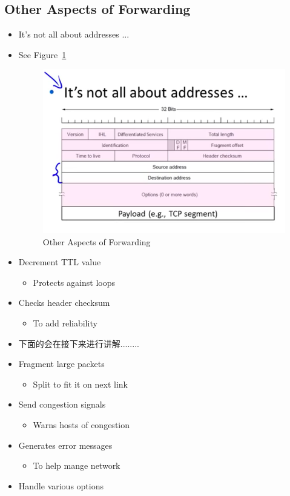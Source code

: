 \documentclass[12pt]{ctexart}   %
\begin{document}
	\subsection{Other Aspects of Forwarding}
	\begin{itemize}
		\item It's not all about addresses ...
		\item See Figure~\ref{fig:4-5-4}
		
		\begin{figure}[h!] %
		\centering
		 \includegraphics[scale=0.7]{images/4-5-4}
		\caption{Other Aspects of Forwarding}
		 \label{fig:4-5-4}
		 \end{figure}
		 
		\item Decrement TTL value
		\begin{itemize}
			\item Protects against loops
		\end{itemize}
		
		\item Checks header checksum
		\begin{itemize}
			\item To add reliability
		\end{itemize}
		
		\item 下面的会在接下来进行讲解........
		\item Fragment large packets
		\begin{itemize}
			\item Split to fit it on next link
		\end{itemize}
		
		\item Send congestion signals
		\begin{itemize}
			\item Warns hosts of congestion
		\end{itemize}
		
		\item Generates error messages
		\begin{itemize}
			\item To help mange network
		\end{itemize}
		
		\item Handle various options
		 
	\end{itemize}
	
\end{document}
